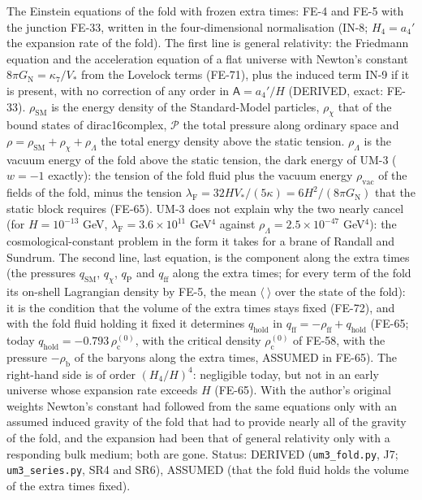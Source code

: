 \documentclass[
  10pt,
]{article}
\begin{document}
The Einstein equations of the fold with frozen extra times: FE-4 and
FE-5 with the junction FE-33, written in the four-dimensional
normalisation (IN-8; \(H_4 = a_4'\) the expansion rate of the fold). The
first line is general relativity: the Friedmann equation and the
acceleration equation of a flat universe with Newton's constant
\(8\pi G_{\mathrm{N}} = \kappa_7/V_*\) from the Lovelock terms (FE-71),
plus the induced term IN-9 if it is present, with no correction of any
order in \(\mathsf{A} = a_4'/H\) (DERIVED, exact: FE-33).
\(\rho_{\mathrm{SM}}\) is the energy density of the Standard-Model
particles, \(\rho_\chi\) that of the bound states of dirac16complex,
\(\mathcal{P}\) the total pressure along ordinary space and
\(\rho = \rho_{\mathrm{SM}} + \rho_\chi + \rho_\Lambda\) the total
energy density above the static tension. \(\rho_\Lambda\) is the vacuum
energy of the fold above the static tension, the dark energy of UM-3
(\(w = -1\) exactly): the tension of the fold fluid plus the vacuum
energy \(\rho_{\mathrm{vac}}\) of the fields of the fold, minus the
tension
\(\lambda_{\mathrm{F}} = 32HV_*/(5\kappa) = 6H^2/(8\pi G_{\mathrm{N}})\)
that the static block requires (FE-65). UM-3 does not explain why the
two nearly cancel (for \(H = 10^{-13}\) GeV,
\(\lambda_{\mathrm{F}} = 3.6\times10^{11}\) GeV\(^4\) against
\(\rho_\Lambda = 2.5\times10^{-47}\) GeV\(^4\)): the
cosmological-constant problem in the form it takes for a brane of
Randall and Sundrum. The second line, last equation, is the component
along the extra times (the pressures \(q_{\mathrm{SM}}\), \(q_\chi\),
\(q_{\mathrm{P}}\) and \(q_{\mathrm{ff}}\) along the extra times; for
every term of the fold its on-shell Lagrangian density by FE-5, the mean
\(\langle\ \rangle\) over the state of the fold): it is the condition
that the volume of the extra times stays fixed (FE-72), and with the
fold fluid holding it fixed it determines \(q_{\mathrm{hold}}\) in
\(q_{\mathrm{ff}} = -\rho_{\mathrm{ff}} + q_{\mathrm{hold}}\) (FE-65;
today \(q_{\mathrm{hold}} = -0.793\,\rho_{\mathrm{c}}^{(0)}\), with the
critical density \(\rho_{\mathrm{c}}^{(0)}\) of FE-58, with the pressure
\(-\rho_{\mathrm{b}}\) of the baryons along the extra times, ASSUMED in
FE-65). The right-hand side is of order \((H_4/H)^4\): negligible today,
but not in an early universe whose expansion rate exceeds \(H\) (FE-65).
With the author's original weights Newton's constant had followed from
the same equations only with an assumed induced gravity of the fold that
had to provide nearly all of the gravity of the fold, and the expansion
had been that of general relativity only with a responding bulk medium;
both are gone. Status: DERIVED (\texttt{um3\_fold.py}, J7;
\texttt{um3\_series.py}, SR4 and SR6), ASSUMED (that the fold fluid
holds the volume of the extra times fixed).
\end{document}
